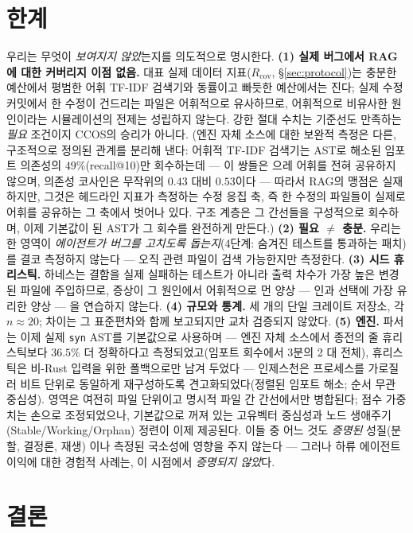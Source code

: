 \documentclass[11pt]{article}
\newcommand{\code}[1]{\texttt{#1}}
\begin{document}
\section{한계}

우리는 무엇이 \emph{보여지지 않았}는지를 의도적으로 명시한다.
\textbf{(1) 실제 버그에서 RAG에 대한 커버리지 이점 없음.} 대표 실제 데이터 지표($R_{\mathrm{cov}}$,
\S\ref{sec:protocol})는 충분한 예산에서 평범한 어휘 TF-IDF 검색기와 동률이고 빠듯한 예산에서는 진다; 실제 수정 커밋에서
한 수정이 건드리는 파일은 어휘적으로 유사하므로, 어휘적으로 비유사한 원인이라는 시뮬레이션의 전제는 성립하지 않는다.
강한 절대 수치는 기준선도 만족하는 \emph{필요} 조건이지 CCOS의 승리가 아니다.
(엔진 자체 소스에 대한 보완적 측정은 다른, 구조적으로 정의된 관계를 분리해 낸다: 어휘적 TF-IDF 검색기는 AST로 해소된 임포트 의존성의 $49\%$(recall@10)만 회수하는데 --- 이 쌍들은 으레 어휘를 전혀 공유하지 않으며, 의존성 코사인은 무작위의 $0.43$ 대비 $0.53$이다 --- 따라서 RAG의 맹점은 실재하지만, 그것은 헤드라인 지표가 측정하는 수정 응집 축, 즉 한 수정의 파일들이 실제로 어휘를 공유하는 그 축에서 벗어나 있다. 구조 계층은 그 간선들을 구성적으로 회수하며, 이제 기본값이 된 AST가 그 회수를 완전하게 만든다.)
\textbf{(2) 필요 $\neq$ 충분.} 우리는 한 영역이 \emph{에이전트가 버그를 고치도록 돕는지}(4단계: 숨겨진 테스트를
통과하는 패치)를 결코 측정하지 않는다 --- 오직 관련 파일이 검색 가능한지만 측정한다.
\textbf{(3) 시드 휴리스틱.} 하네스는 결함을 실제 실패하는 테스트가 아니라 출력 차수가 가장 높은 변경된 파일에 주입하므로,
증상이 그 원인에서 어휘적으로 먼 양상 --- 인과 선택에 가장 유리한 양상 --- 을 연습하지 않는다.
\textbf{(4) 규모와 통계.} 세 개의 단일 크레이트 저장소, 각 $n\!\approx\!20$; 차이는 그 표준편차와 함께 보고되지만 교차
검증되지 않았다.
\textbf{(5) 엔진.} 파서는 이제 실제 \code{syn} AST를 기본값으로 사용하며 --- 엔진 자체 소스에서 종전의 줄 휴리스틱보다 $36.5\%$ 더 정확하다고 측정되었고(임포트 회수에서 3분의 2 대 전체), 휴리스틱은 비-Rust 입력을 위한 폴백으로만 남겨 두었다 --- 인제스천은 프로세스를 가로질러 비트 단위로 동일하게 재구성하도록 견고화되었다(정렬된 임포트 해소; 순서 무관 중심성). 영역은 여전히 파일 단위이고 명시적 파일 간 간선에서만 병합된다; 점수 가중치는 손으로 조정되었으나, 기본값으로 꺼져 있는 고유벡터 중심성과 노드 생애주기(Stable/Working/Orphan) 정련이 이제 제공된다. 이들 중 어느 것도 \emph{증명된} 성질(분할, 결정론, 재생)
이나 측정된 국소성에 영향을 주지 않는다 --- 그러나 하류 에이전트 이익에 대한 경험적 사례는, 이 시점에서 \emph{증명되지
않았}다.

\section{결론}
\end{document}
